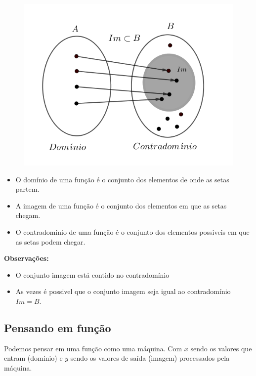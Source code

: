\begin{figure}[H]
	\centering
	
	\includegraphics[scale=3.5]{imagens/domi-imag.png}

\end{figure}

\begin{itemize}

\item O domínio de uma função é o conjunto dos elementos de onde as setas partem.

\item A imagem de uma função é o conjunto dos elementos em que as setas chegam.

\item O contradomínio de uma função é o conjunto dos elementos possiveis em que as setas podem chegar.

\end{itemize}
\textbf{Observações:}
\begin{itemize}
\item O conjunto imagem está contido no contradomínio
\item As vezes é possivel que o conjunto imagem seja igual ao contradomínio $Im = B$.
\end{itemize}

\subsection{Pensando em função}

Podemos pensar em uma função como uma máquina. Com $x$ sendo os valores que entram (domínio)  e $y$ sendo os valores de saída (imagem) processados pela máquina. 

